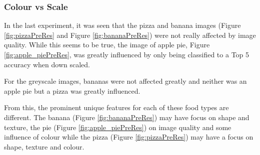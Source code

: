 \tocless\subsubsection{Colour vs Scale}
In the last experiment, it was seen that the pizza and banana images (Figure \ref{fig:pizzaPreRes} and Figure \ref{fig:bananaPreRes}) were not really affected by image quality. While this seems to be true, the image of apple pie, Figure \ref{fig:apple_piePreRes}, was greatly influenced by only being classified to a Top 5 accuracy when down scaled.

For the greyscale images, bananas were not affected greatly and neither was an apple pie but a pizza was greatly influenced.

From this, the prominent unique features for each of these food types are different. The banana (Figure \ref{fig:bananaPreRes}) may have focus on shape and texture, the pie (Figure \ref{fig:apple_piePreRes}) on image quality and some influence of colour while the pizza (Figure \ref{fig:pizzaPreRes}) may have a focus on shape, texture and colour.


